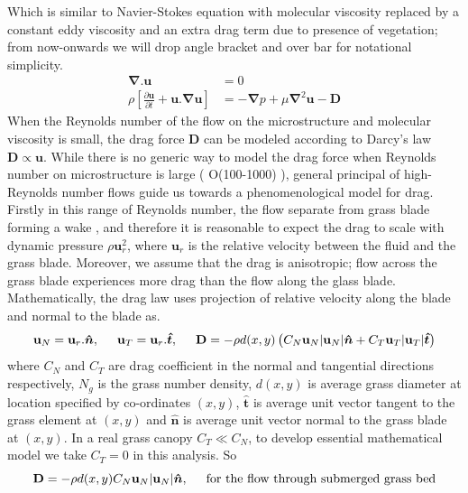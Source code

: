 \documentclass[12pt]{report}   %
\newcommand{\bn}{{\boldsymbol{\hat{n}}}}
\newcommand{\bt}{{\boldsymbol{\hat{t}}}}
\newcommand{\bu}{\mathbf{u}}
\newcommand{\grad}{\mathbf{\nabla}}
\begin{document}
Which is similar to Navier-Stokes equation with molecular viscosity replaced by a constant eddy viscosity and an extra drag term due to presence of vegetation; from now-onwards we will drop angle bracket and over bar for notational simplicity.
\begin{equation}\label{averaged_eq}
\begin{split}
  \grad .{\bu}&=0 \\
 \rho \left[ \frac{\partial {\bu}  }{\partial t}+  {\bu} . \grad \bu  \right ] &= - \grad{p}  +\mu \grad^2\bu - \mathbf{D}
\end{split}
\end{equation}
When the Reynolds number of the flow on the microstructure and molecular viscosity is small, the drag force $\mathbf{D}$ can be modeled according to Darcy's law $\mathbf{D} \propto \bu$. While there is no generic way to model the drag force when Reynolds number on microstructure is large ( O(100-1000) ), general principal of high-Reynolds number flows guide us towards a phenomenological model for drag. Firstly in this range of Reynolds number, the flow separate from grass blade forming a wake , and therefore it is reasonable to expect the drag to scale with dynamic pressure $\rho \bu_r^2$, where $\bu_r$ is the relative velocity between the fluid and the grass blade. Moreover, we assume that the drag is anisotropic; flow across the grass blade experiences more drag than the flow along the glass blade. Mathematically, the drag law uses projection of relative velocity along the blade and normal to the blade as.
\begin{equation}
 \bu_N = \bu_r.\bn,\hspace{0.5cm} \bu_T = \bu_r.\bt,\hspace{.5cm} \mathbf{D} = -\rho d(x,y)\left( C_N \bu_N |\bu_N|\bn + C_T \bu_T |\bu_T| \bt \right)
\end{equation} 
where $C_N$ and $C_T$ are drag coefficient in the normal and tangential directions respectively, $N_g$ is the grass number density, $d(x,y)$ is average grass diameter at location specified by co-ordinates $(x,y)$, $\bt$ is average unit vector tangent to the grass element at $(x,y)$ and $\bn$ is average unit vector normal to the grass blade at $(x,y)$. In a real grass canopy $C_T \ll C_N$, to develop essential mathematical model we take $C_T=0$ in this analysis. So
\begin{equation}
 \mathbf{D} = -\rho d(x,y) C_N \bu_N |\bu_N| \bn, \hspace{.5cm} \text{for the flow through submerged grass bed}
\end{equation}
\end{document}
